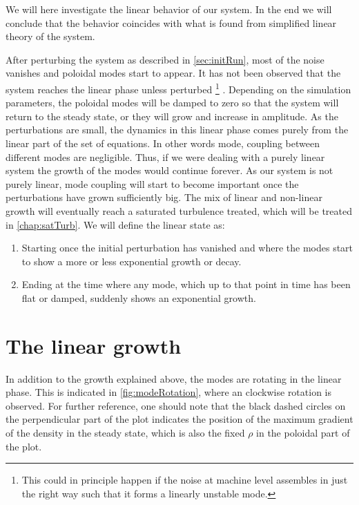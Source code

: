 %
We will here investigate the linear behavior of our system.
In the end we will conclude that the behavior coincides with what is found from simplified linear theory of the system.

After perturbing the system as described in \cref{sec:initRun}, most of the noise vanishes and poloidal modes start to appear.
It has not been observed that the system reaches the linear phase unless perturbed%
\footnote{This could in principle happen if the noise at machine level assembles in just the right way such that it forms a linearly unstable mode.}%
%
.
Depending on the simulation parameters, the poloidal modes will be damped to zero so that the system will return to the steady state, or they will grow and increase in amplitude.
As the perturbations are small, the dynamics in this linear phase comes purely from the linear part of the set of equations.
In other words mode, coupling between different modes are negligible.
Thus, if we were dealing with a purely linear system the growth of the modes would continue forever.
As our system is not purely linear, mode coupling will start to become important once the perturbations have grown sufficiently big.
The mix of linear and non-linear growth will eventually reach a saturated turbulence treated, which will be treated in \cref{chap:satTurb}.
We will define the linear state as:
%
\begin{enumerate}
    \item Starting once the initial perturbation has vanished and where the modes start to show a more or less exponential growth or decay.
    \item Ending at the time where any mode, which up to that point in time has been flat or damped, suddenly shows an exponential growth.
\end{enumerate}
%

\section{The linear growth}
%
In addition to the growth explained above, the modes are rotating in the linear phase.
This is indicated in \cref{fig:modeRotation}, where an clockwise rotation is observed.
For further reference, one should note that the black dashed circles on the perpendicular part of the plot indicates the position of the maximum gradient of the density in the steady state, which is also the fixed $\rho$ in the poloidal part of the plot.

